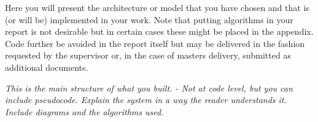 Here you will present the architecture or model that you have chosen and that is (or will be) implemented in your work. Note that putting algorithms in your report is not desirable but in certain cases these might be placed in the appendix. Code further be avoided in the report itself but may be delivered in the fashion requested by the supervisor or, in the case of masters delivery, submitted as additional documents. 

\textit{This is the main structure of what you built.
- Not at code level, but you can include pseudocode.
Explain the system in a way the reader understands it.
Include diagrams and the algorithms used.}















